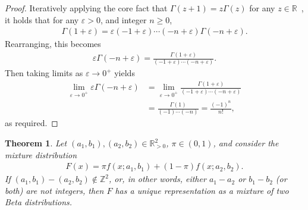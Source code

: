 \documentclass[lettersize,journal]{IEEEtran}
\newtheorem{theorem}{Theorem}
\newtheorem{proof}{Proof}
\begin{document}
\begin{proof}
    Iteratively applying the core fact that $\Gamma(z+1)=z\Gamma(z)$ for any $z \in \mathbb{R}$~\cite{abramowitz1965}, it holds that for any $\varepsilon>0$, and integer $n \geq 0$,
    \begin{align*}
        \Gamma(1+\varepsilon) = \varepsilon(-1+\varepsilon)\cdots(-n+\varepsilon)\Gamma(-n+\varepsilon).
    \end{align*}
    Rearranging, this becomes
    \begin{align*}
        \varepsilon \Gamma(-n+\varepsilon) = \frac{\Gamma(1+\varepsilon)}{(-1+\varepsilon)\cdots (-n+\varepsilon)}.
    \end{align*}
    Then taking limits as $\varepsilon \to 0^+$ yields
    \begin{align*}
        \lim_{\varepsilon\to 0^+} \varepsilon \Gamma(-n+\varepsilon) &= \lim\limits_{\varepsilon \to 0^+} \frac{\Gamma(1+\varepsilon)}{(-1+\varepsilon)\cdots (-n+\varepsilon)}\\
        &= \frac{\Gamma(1)}{(-1)\cdots(-n)} = \frac{(-1)^n}{n!},
    \end{align*}
    as required.
\end{proof}



\begin{theorem} \label{th:1}
    Let $(a_1,b_1),(a_2,b_2) \in \mathbb{R}^2_{>0}$, $\pi \in (0,1)$, and consider the mixture distribution
    \begin{align*}
        F(x) = \pi f(x;a_1,b_1)+(1-\pi)f(x;a_2,b_2).
    \end{align*}
    If $(a_1,b_1)-(a_2,b_2) \notin \mathbb{Z}^2$, or, in other words, either $a_1-a_2$ or $b_1-b_2$ (or both) are not integers, then $F$ has a unique representation as a mixture of two Beta distributions.
\end{theorem}
\end{document}
